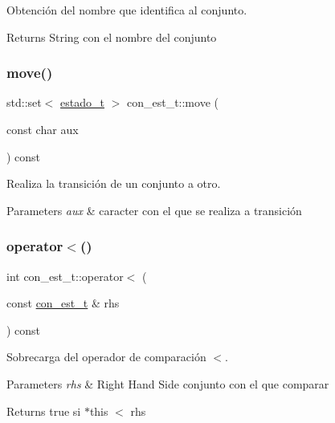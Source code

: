 Obtención del nombre que identifica al conjunto. 

\begin{DoxyReturn}{Returns}
String con el nombre del conjunto 
\end{DoxyReturn}
\mbox{\label{classcon__est__t_a1da98e6185b4e249552c3611891aaefd}} 
\subsubsection{\texorpdfstring{move()}{move()}}
{\footnotesize\ttfamily std\+::set$<$ \hyperlink{classestado__t}{estado\+\_\+t} $>$ con\+\_\+est\+\_\+t\+::move (\begin{DoxyParamCaption}\item[{const char}]{aux }\end{DoxyParamCaption}) const}



Realiza la transición de un conjunto a otro. 


\begin{DoxyParams}{Parameters}
{\em aux} & caracter con el que se realiza a transición \\
\hline
\end{DoxyParams}
\mbox{\label{classcon__est__t_a4c7c0ded0fd4ff7c1a1ab4ec34a48bc8}} 
\subsubsection{\texorpdfstring{operator$<$()}{operator<()}}
{\footnotesize\ttfamily int con\+\_\+est\+\_\+t\+::operator$<$ (\begin{DoxyParamCaption}\item[{const \hyperlink{classcon__est__t}{con\+\_\+est\+\_\+t} \&}]{rhs }\end{DoxyParamCaption}) const\hspace{0.3cm}{\ttfamily [inline]}}



Sobrecarga del operador de comparación $<$. 


\begin{DoxyParams}{Parameters}
{\em rhs} & Right Hand Side conjunto con el que comparar \\
\hline
\end{DoxyParams}
\begin{DoxyReturn}{Returns}
true si $\ast$this $<$ rhs 
\end{DoxyReturn}
\mbox{\label{classcon__est__t_a0cafe8405d65c85598d36a5ca8785a30}} 
